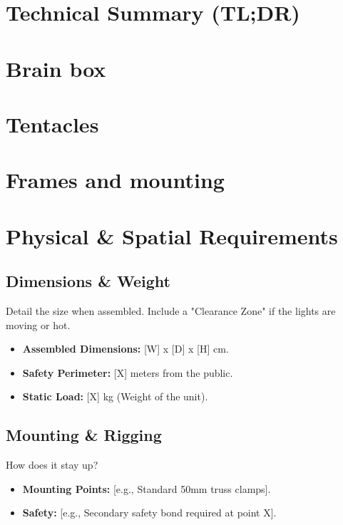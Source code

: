 \documentclass[11pt, a4paper]{article}
\begin{document}

\thispagestyle{empty}

\begin{abstract}
\noindent This document outlines the physical, electrical, and data requirements for the installation of \textbf{Somatic Sentience}. It is intended for site managers, production technicians, and safety officers.
\end{abstract}

\newpage
\tableofcontents
\newpage

\section{Technical Summary (TL;DR)}


\section{Brain box}


\section{Tentacles}


\section{Frames and mounting}


\section{Physical \& Spatial Requirements}
\subsection{Dimensions \& Weight}
Detail the size when assembled. Include a "Clearance Zone" if the lights are moving or hot.
\begin{itemize}
    \item \textbf{Assembled Dimensions:} [W] x [D] x [H] cm.
    \item \textbf{Safety Perimeter:} [X] meters from the public.
    \item \textbf{Static Load:} [X] kg (Weight of the unit).
\end{itemize}

\subsection{Mounting \& Rigging}
How does it stay up? 
\begin{itemize}
    \item \textbf{Mounting Points:} [e.g., Standard 50mm truss clamps].
    \item \textbf{Safety:} [e.g., Secondary safety bond required at point X].
\end{itemize}
\end{document}
